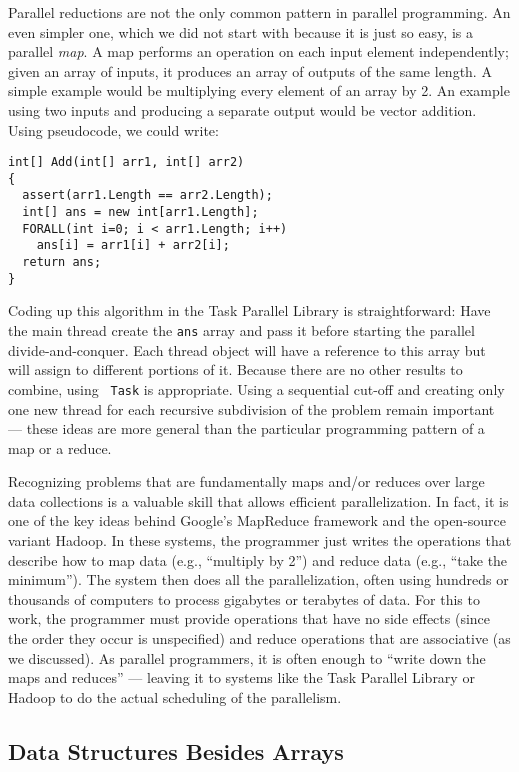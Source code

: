 \documentclass[10pt]{article}
\begin{document}
Parallel reductions are not the only common pattern in parallel
programming.  An even simpler one, which we did not start with because
it is just so easy, is a parallel \emph{map}.  A map performs an
operation on each input element independently; given an array of inputs,
it produces an array of outputs of the same length.  A simple example
would be multiplying every element of an array by 2.  An example using
two inputs and producing a separate output would be vector addition.
Using pseudocode, we could write:
\begin{verbatim}
int[] Add(int[] arr1, int[] arr2)
{
  assert(arr1.Length == arr2.Length);
  int[] ans = new int[arr1.Length];
  FORALL(int i=0; i < arr1.Length; i++)
    ans[i] = arr1[i] + arr2[i];
  return ans;
}
\end{verbatim}
Coding up this algorithm in the Task Parallel Library is straightforward:
Have the main thread create the {\tt ans} array and pass it before starting the
parallel divide-and-conquer.  Each thread object will have a reference
to this array but will assign to different portions of it.  Because
there are no other results to combine, using {\tt
  Task} is appropriate.  Using a sequential cut-off and
creating only one new thread for each recursive subdivision of the
problem remain important --- these ideas are more general than the
particular programming pattern of a map or a reduce.

Recognizing problems that are fundamentally maps and/or reduces over
large data collections is a valuable skill that allows efficient
parallelization.  In fact, it is one of the key ideas behind Google's
MapReduce framework and the open-source variant Hadoop.  In these
systems, the programmer just writes the operations that describe how
to map data (e.g., ``multiply by 2'') and reduce data (e.g., ``take
the minimum'').  The system then does all the parallelization, often
using hundreds or thousands of computers to process gigabytes or
terabytes of data.  For this to work, the programmer must provide
operations that have no side effects (since the order they occur
is unspecified) and reduce operations that are associative (as we
discussed).  As parallel programmers, it is often enough to ``write
down the maps and reduces'' --- leaving it to systems like the
Task Parallel Library or Hadoop to do the actual scheduling of the
parallelism.

\subsection{Data Structures Besides Arrays}
\label{sec:beyond-arrays}
\end{document}
